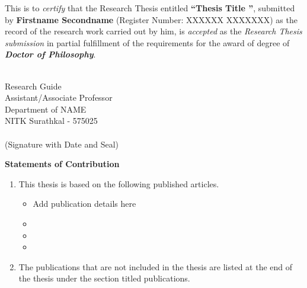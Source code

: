 \documentclass[12pt, twoside,openright]{report}
\begin{document}
\begin{spacing}{1.5}
\begin{titlepage}
\vspace*{0.5in}
\indent This is to \textit{certify} that the Research Thesis entitled {\bf \textquotedblleft{Thesis Title \textquotedblright}}, submitted by {\bf Firstname Secondname} (Register Number: XXXXXX XXXXXXX) as the record of the research work carried out by him, is \textit{accepted} as the \textit{Research Thesis submission} in partial fulfillment of the requirements for the award of degree of {\bf\textit{Doctor of Philosophy}}.

\vspace*{1in}

\begin{singlespacing}
\hspace*{1.5in} 
\parbox{3in}
{ \\
\noindent Research Guide \\ 
\noindent Assistant/Associate Professor\\
\noindent Department of NAME\\
\noindent NITK Surathkal - 575025 
\vspace*{1.2in}\\
 \\
\noindent (Signature with Date and Seal)} 
\end{singlespacing} 
\vspace*{0.25in}
\end{titlepage}


\newpage
\thispagestyle{empty}
\mbox{}
\newpage
\begin{titlepage}
\pagestyle{empty}
\begin{center}
\large \textbf{Statements of Contribution}
\end{center}


\begin{enumerate}
    \item 
   This thesis is based on the following published articles.
\begin{itemize}
    \item Add publication details here
    \item 
    \item
     \item
\end{itemize}
\item
The publications that are not included in the thesis are listed at the end of the thesis under the section titled publications.



\end{enumerate}
\end{titlepage}
\end{spacing}
\end{document}
